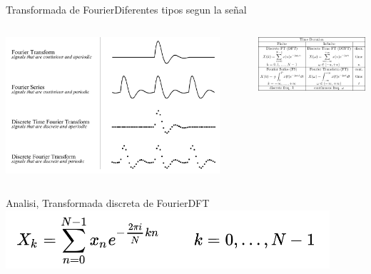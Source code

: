  \begin{frame}{Transformada de Fourier}{Diferentes tipos segun la señal}
   \begin{columns}[c]
      \begin{column}{.45\textwidth}
    \includegraphics[width=0.9\textwidth]{3_clase/fourier_types}
      \end{column}
      \begin{column}{.55\textwidth}
    \includegraphics[width=1.0\textwidth]{3_clase/fourier_table}
      \end{column}
   \end{columns}
    \vfill
 \end{frame}
 \begin{frame}{Analisi, Transformada discreta de Fourier}{DFT}
    \center\includegraphics[width=0.9\textwidth]{3_clase/dft_eq}
    \vfill
 \end{frame}

